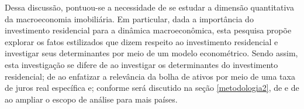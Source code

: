 Dessa discussão, pontuou-se a necessidade de se estudar a dimensão quantitativa da macroeconomia imobiliária. %
Em particular, dada a importância do investimento residencial para a dinâmica macroeconômica, esta pesquisa propõe explorar os fatos estilizados que dizem respeito ao investimento residencial e 
investigar seus determinantes por meio de um modelo econométrico.
Sendo assim, esta investigação se difere de \textcite{wood_house_2020} ao investigar os determinantes do investimento residencial; de \textcite{arestis_residential_2015} ao enfatizar a relevância da bolha de ativos por meio de uma taxa de juros real específica e; conforme será discutido na seção \ref{metodologia2}, de \textcite{teixeira_crescimento_2015} e de \textcite{petrini_demanda_2019} ao ampliar o escopo de análise para mais países. 











